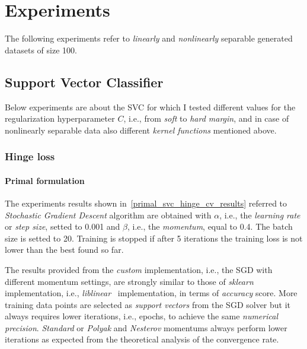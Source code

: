 \section{Experiments}

The following experiments refer to \emph{linearly} and \emph{nonlinearly} separable generated datasets of size 100.

\subsection{Support Vector Classifier}

Below experiments are about the SVC for which I tested different values for the regularization hyperparameter $C$, i.e., from \emph{soft} to \emph{hard margin}, and in case of nonlinearly separable data also different \emph{kernel functions} mentioned above.

\subsubsection{Hinge loss}

\paragraph{Primal formulation}

The experiments results shown in~\ref{primal_svc_hinge_cv_results} referred to \emph{Stochastic Gradient Descent} algorithm are obtained with $\alpha$, i.e., the \emph{learning rate} or \emph{step size}, setted to 0.001 and $\beta$, i.e., the \emph{momentum}, equal to 0.4. The batch size is setted to 20. Training is stopped if after 5 iterations the training loss is not lower than the best found so far.



The results provided from the \emph{custom} implementation, i.e., the SGD with different momentum settings, are strongly similar to those of \emph{sklearn} implementation, i.e., \emph{liblinear}~\cite{fan2008liblinear} implementation, in terms of \emph{accuracy} score. More training data points are selected as \emph{support vectors} from the SGD solver but it always requires lower iterations, i.e., epochs, to achieve the same \emph{numerical precision}. \emph{Standard} or \emph{Polyak} and \emph{Nesterov} momentums always perform lower iterations as expected from the theoretical analysis of the convergence rate.

